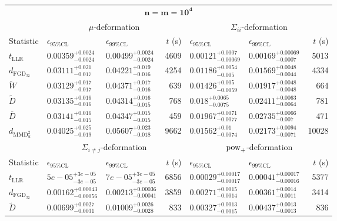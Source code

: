 \begin{tabular}{l|llr|llr}
	\toprule
	\multicolumn{7}{c}{$\mathbf{n=m=10^{4}}$} \\
	\multicolumn{1}{c}{} & \multicolumn{3}{c}{$\mu$-deformation} & \multicolumn{3}{c}{$\Sigma_{ii}$-deformation} \\
	Statistic & $\epsilon_{95\%\mathrm{CL}}$ & $\epsilon_{99\%\mathrm{CL}}$ & $t$ (s) & $\epsilon_{95\%\mathrm{CL}}$ & $\epsilon_{99\%\mathrm{CL}}$ & $t$ (s) \\
	\midrule
	$t_{\mathrm{LLR}}$ & $0.00359_{-0.0024}^{+0.0024}$ & $0.00499_{-0.0024}^{+0.0024}$ & 4609 & $0.00121_{-0.00069}^{+0.0007}$ & $0.00169_{-0.0007}^{+0.00069}$ & 5013 \\
	$d_{\mathrm{FGD}_{\infty}}$ & $0.03111_{-0.017}^{+0.021}$ & $0.04221_{-0.016}^{+0.019}$ & 4254 & $0.01186_{-0.005}^{+0.0054}$ & $0.01569_{-0.0044}^{+0.0048}$ & 4334 \\
	$\widetilde{W}$ & $0.03129_{-0.017}^{+0.017}$ & $0.04371_{-0.016}^{+0.017}$ & 639 & $0.01426_{-0.0059}^{+0.005}$ & $0.01917_{-0.0048}^{+0.0048}$ & 664 \\
	$\widetilde{D}$ & $0.03135_{-0.016}^{+0.016}$ & $0.04314_{-0.015}^{+0.016}$ & 768 & $0.018_{-0.0075}^{+0.0065}$ & $0.02411_{-0.0064}^{+0.0063}$ & 781 \\
	$\overline{D}$ & $0.03141_{-0.015}^{+0.016}$ & $0.04347_{-0.015}^{+0.015}$ & 459 & $0.01967_{-0.0077}^{+0.0071}$ & $0.02735_{-0.007}^{+0.0066}$ & 471 \\
	$d_{\mathrm{MMD}^{2}_{u}}$ & $0.04025_{-0.019}^{+0.025}$ & $0.05607_{-0.018}^{+0.023}$ & 9662 & $0.01562_{-0.0074}^{+0.01}$ & $0.02173_{-0.0071}^{+0.0094}$ & 10028 \\
	\toprule
	\multicolumn{1}{c}{} & \multicolumn{3}{c}{$\Sigma_{i\neq j}$-deformation} & \multicolumn{3}{c}{$\rm{pow}_{+}$-deformation} \\
	Statistic & $\epsilon_{95\%\mathrm{CL}}$ & $\epsilon_{99\%\mathrm{CL}}$ & $t$ (s) & $\epsilon_{95\%\mathrm{CL}}$ & $\epsilon_{99\%\mathrm{CL}}$ & $t$ (s) \\
	\midrule
	$t_{\mathrm{LLR}}$ & $5e-05_{-3e-05}^{+3e-05}$ & $7e-05_{-3e-05}^{+3e-05}$ & 6856 & $0.00029_{-0.00017}^{+0.00017}$ & $0.00041_{-0.00016}^{+0.00017}$ & 5377 \\
	$d_{\mathrm{FGD}_{\infty}}$ & $0.00162_{-0.00056}^{+0.00043}$ & $0.00213_{-0.00041}^{+0.00036}$ & 3859 & $0.00271_{-0.0014}^{+0.0015}$ & $0.00361_{-0.0011}^{+0.0014}$ & 3414 \\
	$\widetilde{D}$ & $0.00699_{-0.0031}^{+0.0027}$ & $0.01009_{-0.0028}^{+0.0026}$ & 833 & $0.00327_{-0.0015}^{+0.0013}$ & $0.00437_{-0.0013}^{+0.0013}$ & 836 \\

\end{tabular}
